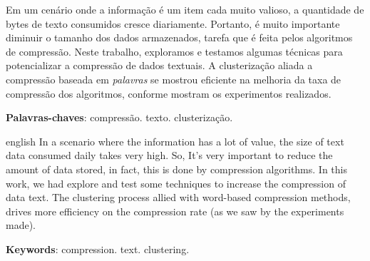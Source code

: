 
\setlength{\absparsep}{18pt} %
\begin{resumo}
Em um cenário onde a informação é um item cada muito valioso, a quantidade de bytes de texto consumidos cresce diariamente.
Portanto, é muito importante diminuir o tamanho dos dados armazenados, tarefa que é feita pelos algoritmos de compressão.
Neste trabalho, exploramos e testamos algumas técnicas para potencializar a compressão de dados textuais.
A clusterização aliada a compressão baseada em \emph{palavras} se mostrou eficiente na melhoria da taxa de compressão dos algoritmos, conforme mostram os experimentos realizados.

 \textbf{Palavras-chaves}: compressão. texto. clusterização.
\end{resumo}

\begin{resumo}[Abstract]
 \begin{otherlanguage*}{english}
In a scenario where the information has a lot of value, the size of text data consumed daily takes very high.
So, It's very important to reduce the amount of data stored, in fact, this is done by compression algorithms.
In this work, we had explore and test some techniques to increase the compression of data text.
The clustering process allied with word-based compression methods, drives more efficiency on the compression rate (as we saw by the experiments made).

   \noindent 
   \textbf{Keywords}: compression. text. clustering.
 \end{otherlanguage*}
\end{resumo}